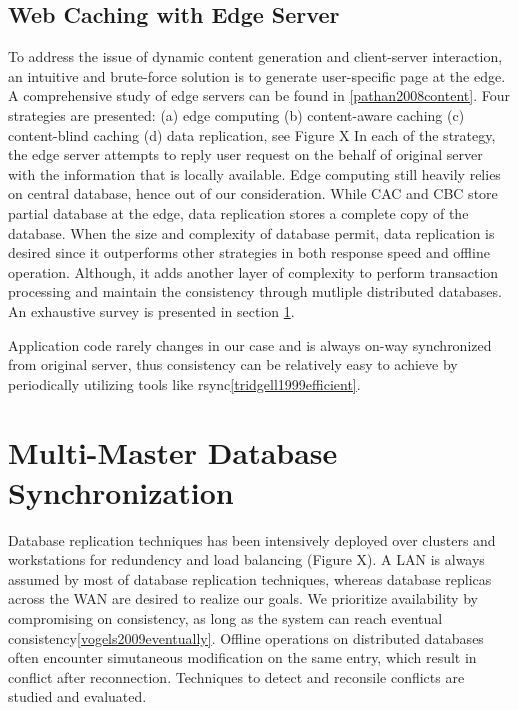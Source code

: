 
\subsection{Web Caching with Edge Server}
To address the issue of dynamic content generation and client-server interaction, an intuitive and brute-force solution is to generate user-specific page at the edge. A comprehensive study of edge servers can be found in \ref{pathan2008content}. Four strategies are presented: (a) edge computing (b) content-aware caching (c) content-blind caching (d) data replication, see Figure X
In each of the strategy, the edge server attempts to reply user request on the behalf of original server with the information that is locally available. Edge computing still heavily relies on central database, hence out of our consideration. While CAC and CBC store partial database at the edge, data replication stores a complete copy of the database. When the size and complexity of database permit, data replication is desired since it outperforms other strategies in both response speed and offline operation. Although, it adds another layer of complexity to perform transaction processing and maintain the consistency through mutliple distributed databases. An exhaustive survey is presented in section \ref{database_sync}.

Application code rarely changes in our case and is always on-way synchronized from original server, thus consistency can be relatively easy to achieve by periodically utilizing tools like rsync\ref{tridgell1999efficient}.


\section{Multi-Master Database Synchronization} \label{database_sync}
Database replication techniques has been intensively deployed over clusters and workstations for redundency and load balancing (Figure X).  A LAN is always assumed by most of database replication techniques, whereas database replicas across the WAN are desired to realize our goals. We prioritize availability by compromising on consistency, as long as the system can reach eventual consistency\ref{vogels2009eventually}. Offline operations on distributed databases often encounter simutaneous modification on the same entry, which result in conflict after reconnection. Techniques to detect and reconsile conflicts are studied and evaluated.

